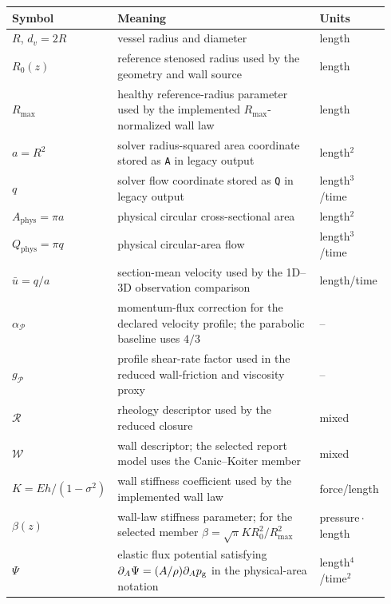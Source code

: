 \noindent\begin{minipage}[t]{\textwidth}
\begin{compactacronymtables}
\setlength{\parskip}{0pt}
\begin{tabular}{@{}>{\raggedright\arraybackslash}p{0.24\linewidth}
        >{\raggedright\arraybackslash}p{0.56\linewidth}
        >{\raggedright\arraybackslash}p{0.14\linewidth}@{}}
        \toprule
        \textbf{Symbol} & \textbf{Meaning} & \textbf{Units} \\
        \midrule
        $R$, $d_v=2R$ & vessel radius and diameter & length \\
        $R_0(z)$ & reference stenosed radius used by the geometry and wall source & length \\
        $R_{\max}$ & healthy reference-radius parameter used by the implemented $R_{\max}$-normalized wall law & length \\
        $a=R^2$ & solver radius-squared area coordinate stored as \texttt{A} in legacy output & length$^2$ \\
        $q$ & solver flow coordinate stored as \texttt{Q} in legacy output & length$^3$/time \\
        $A_{\mathrm{phys}}=\pi a$ & physical circular cross-sectional area & length$^2$ \\
        $Q_{\mathrm{phys}}=\pi q$ & physical circular-area flow & length$^3$/time \\
        $\bar u=q/a$ & section-mean velocity used by the 1D--3D observation comparison & length/time \\
        $\alpha_{\mathcal P}$ & momentum-flux correction for the declared velocity profile; the parabolic baseline uses $4/3$ & -- \\
        $g_{\mathcal P}$ & profile shear-rate factor used in the reduced wall-friction and viscosity proxy & -- \\
        $\mathcal R$ & rheology descriptor used by the reduced closure & mixed \\
        $\mathcal W$ & wall descriptor; the selected report model uses the Canic--Koiter member & mixed \\
        $K=Eh/(1-\sigma^2)$ & wall stiffness coefficient used by the implemented wall law & force/length \\
        $\beta(z)$ & wall-law stiffness parameter; for the selected member $\beta=\sqrt\pi K R_0^2/R_{\max}^2$ & pressure\,$\cdot$\,length \\
        $\Psi$ & elastic flux potential satisfying $\partial_A\Psi=(A/\rho)\partial_Ap_{\mathrm g}$ in the physical-area notation & length$^4$/time$^2$ \\

\end{tabular}
\end{compactacronymtables}
\end{minipage}
